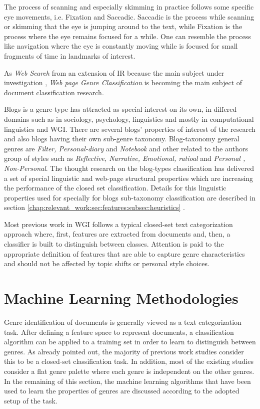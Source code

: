 The process of scanning and especially skimming in practice follows some specific eye movements, i.e. Fixation and Saccadic. Saccadic is the process while scanning or skimming that the eye is jumping around to the text, while Fixation is the process where the eye remains focused for a while. One can resemble the process like navigation where the eye is constantly moving while is focused for small fragments of time in landmarks of interest.
  
As \textit{Web Search} from an extension of IR because the main subject under investigation \parencite{manning2008introduction}, \textit{Web page Genre Classification } is becoming the main subject of document classification research.

Blogs is a genre-type has attracted as special interest on its own, in differed domains such as in sociology, psychology, linguistics and mostly in computational linguistics and WGI. There are several blogs' properties of interest of the research and  also blogs having their own sub-genre taxonomy. Blog-taxonomy general genres are \textit{Filter, Personal-diary} and \textit{Notebook} and other related to the authors group of styles such as \textit{Reflective, Narrative, Emotional, ratioal} and \textit{Personal , Non-Personal}. The thought research on the blog-types classification has delivered a set of special linguistic and web-page structural properties which are increasing the performance of the closed set classification. Details for this linguistic properties used for specially for blogs sub-taxonomy classification are described in section \ref{chap:relevant_work:sec:features:subsec:heuristics} \parencite{virik2017blog,hoffmann2012cohesive,hoffmann2012cohesive,derczynski2014social,qu2006automated}. 

Most previous work in WGI follows a typical closed-set text categorization approach where, first, features are extracted from documents and, then, a classifier is built to distinguish between classes. Attention is paid to the appropriate definition of features that are able to capture genre characteristics and should not be affected by topic shifts or personal style choices. 

\section{Machine Learning Methodologies}
\label{chap:relevant_work:sec:machine_learning_methods}

Genre identification of documents is generally viewed as a text categorization task. After defining a feature space to represent documents, a classification algorithm can be applied to a training set in order to learn to distinguish between genres. As already pointed out, the majority of previous work studies consider this to be a closed-set classification task. In addition, most of the existing studies consider a flat genre palette where each genre is independent on the other genres. In the remaining of this section, the machine learning algorithms that have been used to learn the properties of genres are discussed according to the adopted setup of the task. 

